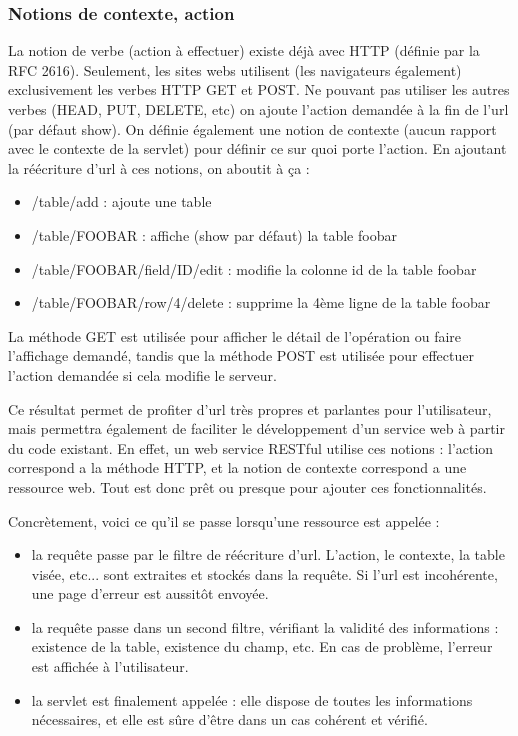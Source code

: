 \subsubsection{Notions de contexte, action}
La notion de verbe (action à effectuer) existe déjà avec HTTP (définie par la RFC 2616). Seulement, les sites webs utilisent (les navigateurs également) exclusivement les verbes HTTP GET et POST. Ne pouvant pas utiliser les autres verbes (HEAD, PUT, DELETE, etc) on ajoute l'action demandée à la fin de l'url (par défaut show). On définie également une notion de contexte (aucun rapport avec le contexte de la servlet) pour définir ce sur quoi porte l'action. En ajoutant la réécriture d'url à ces notions, on aboutit à ça :
\begin{itemize}
	\item{/table/add} : ajoute une table
	\item{/table/FOOBAR} : affiche (show par défaut) la table foobar
	\item{/table/FOOBAR/field/ID/edit} : modifie la colonne id de la table foobar
	\item{/table/FOOBAR/row/4/delete} :  supprime la 4ème ligne de la table foobar
\end{itemize}

La méthode GET est utilisée pour afficher le détail de l'opération ou faire l'affichage demandé, tandis que la méthode POST est utilisée pour effectuer l'action demandée si cela modifie le serveur.

Ce résultat permet de profiter d'url très propres et parlantes pour l'utilisateur, mais permettra également de faciliter le développement d'un service web à partir du code existant. En effet, un web service RESTful utilise ces notions : l'action correspond a la méthode HTTP, et la notion de contexte correspond a une ressource web. Tout est donc prêt ou presque pour ajouter ces fonctionnalités.

Concrètement, voici ce qu'il se passe lorsqu'une ressource est appelée :
\begin{itemize}
	\item la requête passe par le filtre de réécriture d'url. L'action, le contexte, la table visée, etc... sont extraites et stockés dans la requête. Si l'url est incohérente, une page d'erreur est aussitôt envoyée.
	\item la requête passe dans un second filtre, vérifiant la validité des informations : existence de la table, existence du champ, etc. En cas de problème, l'erreur est affichée à l'utilisateur.
	\item la servlet est finalement appelée : elle dispose de toutes les informations nécessaires, et elle est sûre d'être dans un cas cohérent et vérifié.
\end{itemize}

